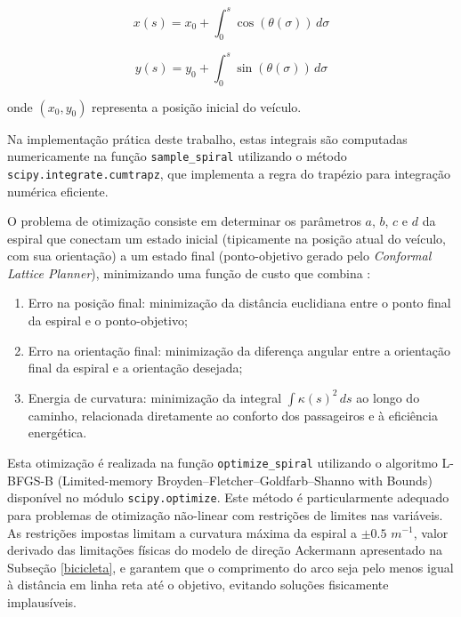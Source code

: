\begin{equation} \label{integral_func_tri_1}
x(s) = x_0 + \int_{0}^{s} \cos(\theta(\sigma)) \, d\sigma
\end{equation}

\begin{equation} \label{integral_func_tri_2}
y(s) = y_0 + \int_{0}^{s} \sin(\theta(\sigma)) \, d\sigma
\end{equation}

onde $(x_0, y_0)$ representa a posição inicial do veículo.

Na implementação prática deste trabalho, estas integrais são computadas numericamente na função \texttt{sample\_spiral} utilizando o método \texttt{scipy.integrate.cumtrapz}, que implementa a regra do trapézio para integração numérica eficiente.

O problema de otimização consiste em determinar os parâmetros $a$, $b$, $c$ e $d$ da espiral que conectam um estado inicial (tipicamente na posição atual do veículo, com sua orientação) a um estado final (ponto-objetivo gerado pelo \textit{Conformal Lattice Planner}), minimizando uma função de custo que combina \cite{University_of_Toronto2018-mp}:

\begin{enumerate}
    \item Erro na posição final: minimização da distância euclidiana entre o ponto final da espiral e o ponto-objetivo;
    \item Erro na orientação final: minimização da diferença angular entre a orientação final da espiral e a orientação desejada;
    \item Energia de curvatura: minimização da integral $\int \kappa(s)^2 \, ds$ ao longo do caminho, relacionada diretamente ao conforto dos passageiros e à eficiência energética.
\end{enumerate}

Esta otimização é realizada na função \texttt{optimize\_spiral} utilizando o algoritmo L-BFGS-B (Limited-memory Broyden–Fletcher–Goldfarb–Shanno with Bounds) disponível no módulo \texttt{scipy.optimize}. Este método é particularmente adequado para problemas de otimização não-linear com restrições de limites nas variáveis. As restrições impostas limitam a curvatura máxima da espiral a $\pm 0.5$ $m^{-1}$, valor derivado das limitações físicas do modelo de direção Ackermann apresentado na Subseção \ref{bicicleta}, e garantem que o comprimento do arco seja pelo menos igual à distância em linha reta até o objetivo, evitando soluções fisicamente implausíveis.

